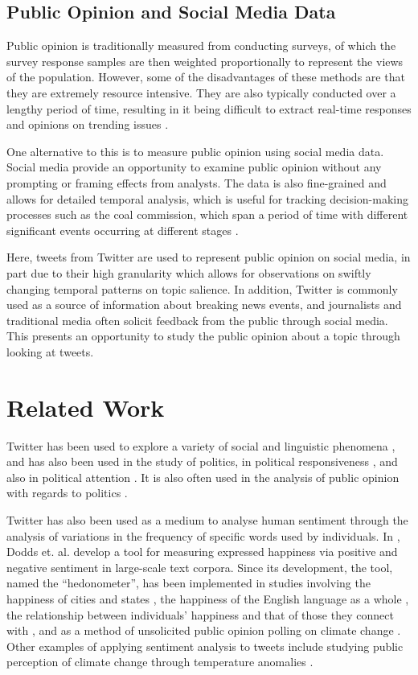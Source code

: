 \documentclass[12pt,onecolumn,twoside]{layout}
\begin{document}
\subsection*{Public Opinion and Social Media Data} %
Public opinion is traditionally measured from conducting surveys, of which the survey response samples are then weighted proportionally to represent the views of the population. However, some of the disadvantages of these methods are that they are extremely resource intensive. They are also typically conducted over a lengthy period of time, resulting in it being difficult to extract real-time responses and opinions on trending issues \cite{Klasnja2018}. 

One alternative to this is to measure public opinion using social media data. Social media provide an opportunity to examine public opinion without any prompting or framing effects from analysts. The data is also fine-grained and allows for detailed temporal analysis, which is useful for tracking decision-making processes such as the coal commission, which span a period of time with different significant events occurring at different stages \cite{Klasnja2018}. 

Here, tweets from Twitter are used to represent public opinion on social media, in part due to their high granularity which allows for observations on swiftly changing temporal patterns on topic salience. In addition, Twitter is commonly used as a source of information about breaking news events, and journalists and traditional media often solicit feedback from the public through social media. This presents an opportunity to study the public opinion about a topic through looking at tweets. 

\section*{Related Work} \label{sec:relatedwork}
Twitter has been used to explore a variety of social and linguistic phenomena \cite{Cao2012, Lin2013, Lin2014}, and has also been used in the study of politics, in political responsiveness \cite{Barbera2019}, and also in political attention \cite{Hemphill2014, Shapiro2017}. It is also often used in the analysis of public opinion with regards to politics \cite{DiGrazia2013, Vaccari2013, Barbera2019}.

Twitter has also been used as a medium to analyse human sentiment through the analysis of variations in the frequency of specific words used by individuals. In \cite{Dodds2011}, Dodds et. al. develop a tool for measuring expressed happiness via positive and negative sentiment in large-scale text corpora. Since its development, the tool, named the ``hedonometer'', has been implemented in studies involving the happiness of cities and states \cite{Bliss2012}, the happiness of the English language as a whole \cite{Kloumann2012}, the relationship between individuals' happiness and that of those they connect with \cite{Mitchell2013}, and as a method of unsolicited public opinion polling on climate change \cite{Cody2015}. Other examples of applying sentiment analysis to tweets include studying public perception of climate change through temperature anomalies \cite{Moore2019}. 
\end{document}
